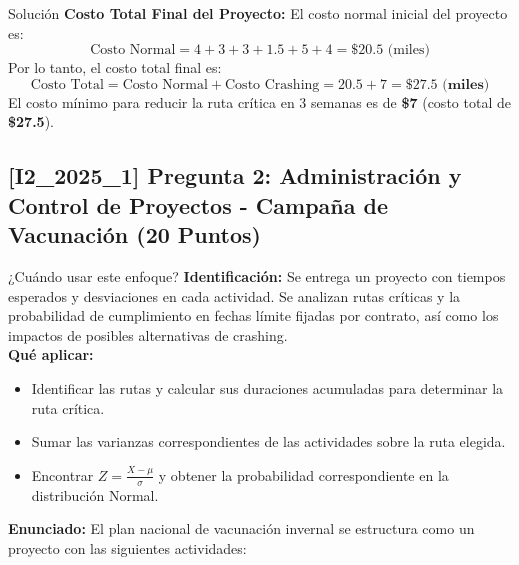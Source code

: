 \documentclass[11pt, a4paper]{article}
\begin{document}
\begin{ejercicio}{Solución}
  \textbf{Costo Total Final del Proyecto:}
  El costo normal inicial del proyecto es:
  \begin{equation*}
    \text{Costo Normal} = 4 + 3 + 3 + 1.5 + 5 + 4 = \$20.5 \text{ (miles)}
  \end{equation*}
  Por lo tanto, el costo total final es:
  \begin{equation*}
    \text{Costo Total} = \text{Costo Normal} + \text{Costo Crashing} = 20.5 + 7 = \mathbf{\$27.5 \text{ (miles)}}
  \end{equation*}
  El costo mínimo para reducir la ruta crítica en 3 semanas es de \textbf{\$7} (costo total de \textbf{\$27.5}).

\end{ejercicio}

\newpage

\subsection*{[I2_2025_1] Pregunta 2: Administración y Control de Proyectos - Campaña de Vacunación (20 Puntos)}
\begin{tipprueba}{¿Cuándo usar este enfoque?}
    \textbf{Identificación:} Se entrega un proyecto con tiempos esperados y desviaciones en cada actividad. Se analizan rutas críticas y la probabilidad de cumplimiento en fechas límite fijadas por contrato, así como los impactos de posibles alternativas de crashing.\\
    \textbf{Qué aplicar:}
    \begin{itemize}
      \item Identificar las rutas y calcular sus duraciones acumuladas para determinar la ruta crítica.
      \item Sumar las varianzas correspondientes de las actividades sobre la ruta elegida.
      \item Encontrar $Z = \frac{X - \mu}{\sigma}$ y obtener la probabilidad correspondiente en la distribución Normal.
    \end{itemize}
  \end{tipprueba}

  \textbf{Enunciado:}
  El plan nacional de vacunación invernal se estructura como un proyecto con las siguientes actividades:
  \begin{center}
  \end{center}
\end{document}
